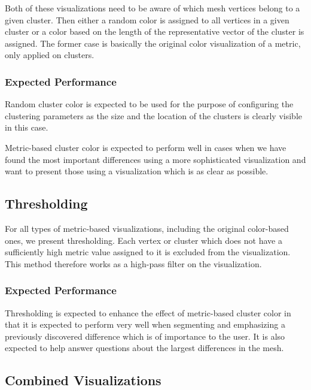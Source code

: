 Both of these visualizations need to be aware of which mesh vertices belong to a given cluster. Then either a random color is assigned to all vertices in a given cluster or a color based on the length of the representative vector of the cluster is assigned. The former case is basically the original color visualization of a metric, only applied on clusters.

\subsubsection{Expected Performance}

Random cluster color is expected to be used for the purpose of configuring the clustering parameters as the size and the location of the clusters is clearly visible in this case.

Metric-based cluster color is expected to perform well in cases when we have found the most important differences using a more sophisticated visualization and want to present those using a visualization which is as clear as possible.
\subsection{Thresholding}

For all types of metric-based visualizations, including the original color-based ones, we present thresholding. Each vertex or cluster which does not have a sufficiently high metric value assigned to it is excluded from the visualization. This method therefore works as a high-pass filter on the visualization.

\subsubsection{Expected Performance}

Thresholding is expected to enhance the effect of metric-based cluster color in that it is expected to perform very well when segmenting and emphasizing a previously discovered difference which is of importance to the user. It is also expected to help answer questions about the largest differences in the mesh.
\subsection{Combined Visualizations}

